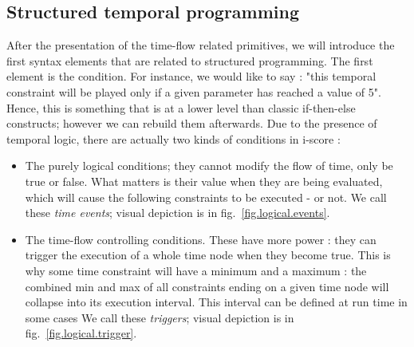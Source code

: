 \documentclass{sigchi}
\begin{document}
\subsection{Structured temporal programming}
After the presentation of the time-flow related primitives, we will introduce the first syntax elements that are related to structured programming.
The first element is the condition. For instance, we would like to say : "this temporal constraint will be played only if a given parameter has reached a value of 5".
Hence, this is something that is at a lower level than classic if-then-else constructs; however we can rebuild them afterwards.
Due to the presence of temporal logic, there are actually two kinds of conditions in i-score : 
\begin{itemize}
	\item The purely logical conditions; they cannot modify the flow of time, only be true or false. What matters is their value when they are being evaluated, which will cause the following constraints to be executed - or not. We call these \textit{time events}; visual depiction is in fig.~\ref{fig.logical.events}.
	\item The time-flow controlling conditions. These have more power : they can trigger the execution of a whole time node when they become true. This is why some time constraint will have a minimum and a maximum : the combined min and max of all constraints ending on a given time node will collapse into its execution interval. This interval can be defined at run time in some cases %
	We call these \textit{triggers}; visual depiction is in fig.~\ref{fig.logical.trigger}.
\end{itemize}
\end{document}
